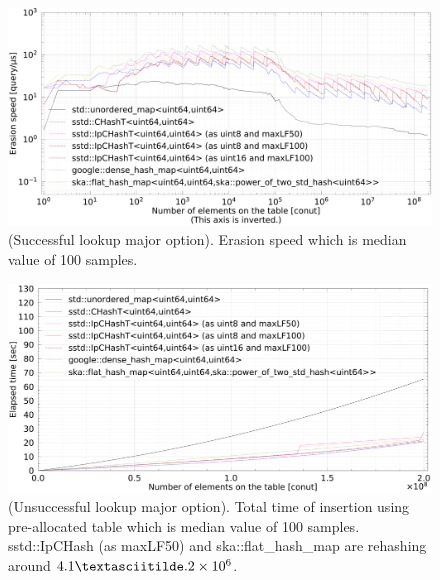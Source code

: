 \begin{figure}[h]
  \hspace{-3mm}
  \includegraphics[scale=0.24]{./fig_bench_sm/erase_med.pdf}
  \caption{
    (Successful lookup major option). Erasion speed which is median value of 100 samples.
  }
  \label{fig_bench_erase_sm}
\end{figure}


\begin{figure}[h]
  \includegraphics[scale=0.24]{./fig_bench_usm/insert_et_preAlloc_med.pdf}
  \caption{
    (Unsuccessful lookup major option). Total time of insertion using pre-allocated table which is median value of 100 samples.
    sstd::IpCHash (as maxLF50) and ska::flat\_hash\_map are rehashing around $4.1\textasciitilde.2\times10^6$.
  }
  \label{fig_bench_insert_preAlloc_um}
\end{figure}

